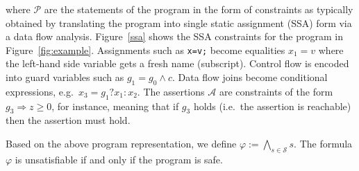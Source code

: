 where $\mathcal{P}$ are the statements of the program in the form of
constraints as typically obtained by translating the program into
single static assignment (SSA) form via a data flow analysis.
%
Figure~\ref{ssa} shows the SSA constraints for the program in Figure~\ref{fig:example}. 
%
Assignments such as \texttt{x=v;} become equalities $x_1=v$ where the
left-hand side variable gets a fresh name (subscript).
%
Control flow is encoded into guard variables such as $g_1=g_0\wedge c$.
%
Data flow joins become conditional expressions, e.g.\ $x_3=g_1?x_1:x_2$.
%
The assertions $\mathcal{A}$ are constraints of the form $g_3
\Rightarrow z\geq 0$, for instance, meaning that if $g_3$ holds
(i.e.\ the assertion is reachable) then the assertion must hold.
%
%
%

% 

%
Based on the above program representation, we define $\varphi:=
\bigwedge_{s\in\mathcal{S}} s$. The formula $\varphi$ is unsatisfiable
if and only if the program is safe.

